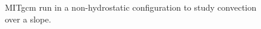 \begin{figure}
\caption{MITgcm run in a non-hydrostatic configuration
to study convection over a slope.}
\label{fig:convect-and-topo}
\end{figure}
